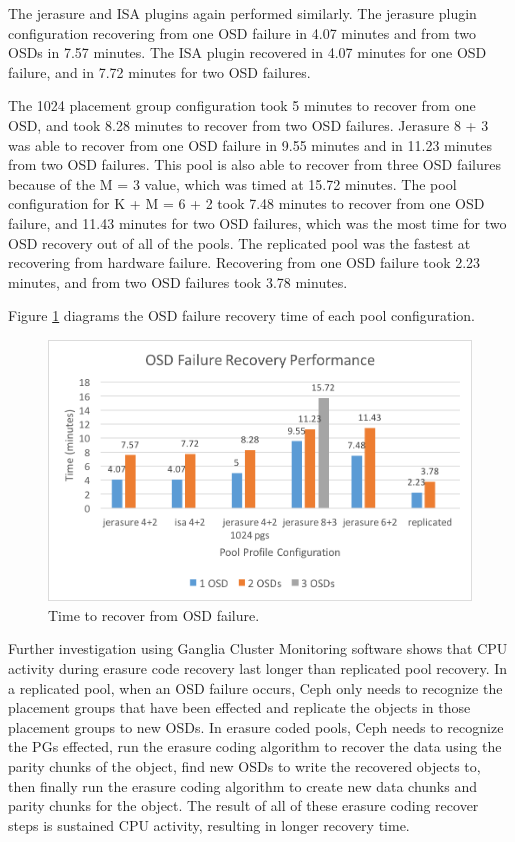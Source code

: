 \documentclass[conference,compsoc]{IEEEtran}
\begin{document}
The jerasure and ISA plugins again performed similarly. The jerasure plugin configuration recovering from one OSD failure in 4.07 minutes and from two OSDs in 7.57 minutes. The ISA plugin recovered in 4.07 minutes for one OSD failure, and in 7.72 minutes for two OSD failures. 

The 1024 placement group configuration took 5 minutes to recover from one OSD, and took 8.28 minutes to recover from two OSD failures. Jerasure 8 + 3 was able to recover from one OSD failure in 9.55 minutes and in 11.23 minutes from two OSD failures. This pool is also able to recover from three OSD failures because of the M = 3 value, which was timed at 15.72 minutes. The pool configuration for K + M = 6 + 2 took 7.48 minutes to recover from one OSD failure, and 11.43 minutes for two OSD failures, which was the most time for two OSD recovery out of all of the pools. The replicated pool was the fastest at recovering from hardware failure. Recovering from one OSD failure took 2.23 minutes, and from two OSD failures took 3.78 minutes. 

Figure \ref{fig:Failure} diagrams the OSD failure recovery time of each pool configuration. 

\begin{figure}

\includegraphics[width=\linewidth]{Failure.png}
\caption{Time to recover from OSD failure.}
\label{fig:Failure}

\end{figure}    


Further investigation using Ganglia Cluster Monitoring software shows that CPU activity during erasure code recovery last longer than replicated pool recovery. In a replicated pool, when an OSD failure occurs, Ceph only needs to recognize the placement groups that have been effected and replicate the objects in those placement groups to new OSDs. In erasure coded pools, Ceph needs to recognize the PGs effected, run the erasure coding algorithm to recover the data using the parity chunks of the object, find new OSDs to write the recovered objects to, then finally run the erasure coding algorithm to create new data chunks and parity chunks for the object. The result of all of these erasure coding recover steps is sustained CPU activity, resulting in longer recovery time. 
\end{document}
